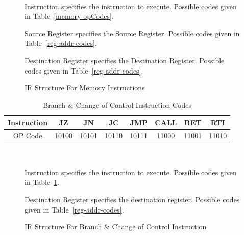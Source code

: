 \documentclass[12pt]{article}
\theoremstyle{plain}
\theoremstyle{definition}
\begin{document}
    \begin{figure}[H]
        \centering
        \caption{IR Structure For Memory Instructions}
        \label{IR-memory}
        \vspace{0.5 cm}
         \\
        \vspace{0.5 cm}
        \begin{regdesc}\begin{reglist}            
            \item [Instruction] specifies the instruction to execute. Possible codes given in Table~\ref{memory opCodes}.
            \item [Source Register] specifies the Source Register. Possible codes given in Table~\ref{reg-addr-codes}.
            \item [Destination Register] specifies the Destination Register. Possible codes given in Table~\ref{reg-addr-codes}.
        \end{reglist}\end{regdesc}
    \end{figure}
    \begin{table}[H]
        \centering
        \begin{tabular}{|c|c|c|c|c|c|c|c|}
            \hline
            Instruction & JZ  & JN & JC  & JMP  & CALL  & RET  & RTI \\ \hline
            OP Code     & 10100 & 10101 & 10110 & 10111 & 11000 & 11001 & 11010 \\ \hline
        \end{tabular}
        \caption{Branch $\&$ Change of Control Instruction Codes}
        \label{Branch Opcodes}
    \end{table}
    \begin{figure}[H]
        \centering
        \caption{IR Structure For Branch $\&$ Change of Control Instruction}
        \label{IR-Branch}
        \vspace{0.5 cm}
         \\
        \vspace{0.5 cm}
        \begin{regdesc}\begin{reglist}            
            \item [Instruction] specifies the instruction to execute. Possible codes given in Table~\ref{Branch Opcodes}.
            \item [Destination Register] specifies the destination register. Possible codes given in Table~\ref{reg-addr-codes}.
        \end{reglist}\end{regdesc}
    \end{figure}
\pagebreak
\end{document}
